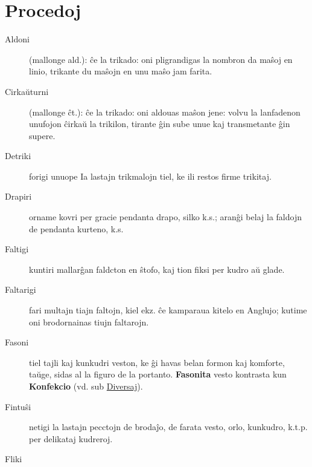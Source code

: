 \section[Procedoj]{Procedoj}
\hypertarget{Procedoj}{}
\label{Procedoj}


\begin{description}
\item[Aldoni]

 (mallonge ald.): ĉe la trikado: oni pligrandigas la nombron da maŝoj en linio, trikante du maŝojn en unu maŝo jam farita.

\item[Cirkaŭturni]

 (mallonge ĉt.): ĉe la trikado: oni aldouas maŝon jene: volvu la lanfadenon unufojon ĉirkaŭ la trikilon, tirante ĝin sube unue kaj transmetante ĝin supere.

\item[Detriki]

 forigi unuope Ia lastajn trikmalojn tiel, ke ili restos firme trikitaj.

\item[Drapiri]

 orname kovri per gracie pendanta drapo, silko k.s.; aranĝi belaj la faldojn de pendanta kurteno, k.s.

\item[Faltigi]

 kuntiri mallarĝan faldcton en ŝtofo, kaj tion fiksi per kudro aŭ glade.

\item[Faltarigi]

 fari multajn tiajn faltojn, kiel ekz. ĉe kamparaua kitelo en Anglujo; kutime oni brodornainas tiujn faltarojn.

\item[Fasoni]

 tiel tajli kaj kunkudri veston, ke ĝi havas belan formon kaj komforte, taŭge, sidas al la figuro de la portanto. \textbf{Fasonita} vesto kontrasta kun \textbf{Konfekcio} (vd. sub \hyperlink{Diversaj}{Diversaj}).

\item[Fintuŝi]

 netigi la lastajn pecctojn de brodaĵo, de farata vesto, orlo, kunkudro, k.t.p. per delikataj kudreroj.

\item[Fliki]


\end{description}
